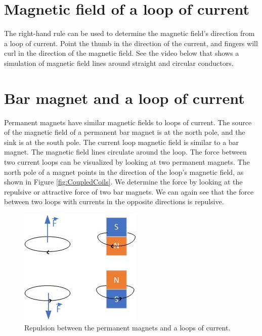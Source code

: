 \documentclass{ximera}
\begin{document}
\begin{center}  
\end{center} 


\section{Magnetic field of a loop of current}

The right-hand rule can be used to determine the magnetic field's direction from a loop of current. Point the thumb in the direction of the current, and fingers will curl in the direction of the magnetic field. See the video below that shows a simulation of magnetic field lines around straight and circular conductors.

\begin{center}  
\end{center} 


\section{Bar magnet and a loop of current}

Permanent magnets have similar magnetic fields to loops of current. The source of the magnetic field of a permanent bar magnet is at the north pole, and the sink is at the south pole. The current loop magnetic field is similar to a bar magnet. The magnetic field lines circulate around the loop. The force between two current loops can be visualized by looking at two permanent magnets. The north pole of a magnet points in the direction of the loop's magnetic field, as shown in Figure \ref{fig:CoupledCoils}. We determine the force by looking at the repulsive or attractive force of two bar magnets. We can again see that the force between two loops with currents in the opposite directions is repulsive.

\begin{figure}[htbp]
\begin{center}
\includegraphics[scale=1]{../jpg/ringsForce.jpg}
\end{center}
\caption{Repulsion between the permanent magnets and a loops of current. }
\label{fig:CoupledCoils1}
\end{figure}
\end{document}
